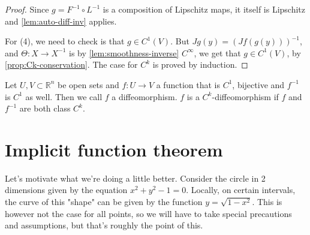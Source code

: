 \begin{proof}
	Since $g = F^{-1} \circ L^{-1}$ is a composition of Lipschitz maps, it itself is Lipschitz and \ref{lem:auto-diff-inv} applies.

	For (4), we need to check is that $g \in C^{1}(V)$. But $Jg(y) = (Jf(g(y)))^{-1}$, and $\Theta: X \to X^{-1}$ is by \ref{lem:smoothness-inverse} $C^{\infty}$, we get that $g \in C^{1}(V)$, by \ref{prop:Ck-conservation}. The case for $C^{k}$ is proved by induction.
\end{proof}

\begin{definition}[Diffeomorphism]\label{def:diffeo}
	Let $U, V \subset \mathbb{R}^{n}$ be open sets and $f: U \to V$ a function that is $C^{1}$, bijective and $f^{-1}$ is $C^{1}$ as well. Then we call $f$ a diffeomorphism. $f$ is a $C^{k}$-diffeomorphism if $f$ and $f^{-1}$ are both class $C^{k}$.
\end{definition}

\newpage

\section{Implicit function theorem}

Let's motivate what we're doing a little better. Consider the circle in 2 dimensions given by the equation $x^{2} + y^{2} - 1 = 0$. Locally, on certain intervals, the curve of this "shape" can be given by the function $y = \sqrt{1-x^{2}}$. This is however not the case for all points, so we will have to take special precautions and assumptions, but that's roughly the point of this.

